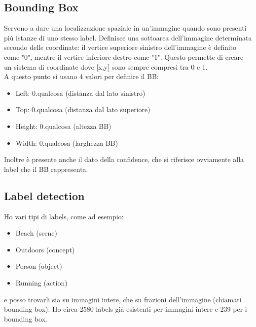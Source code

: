 \documentclass{classes/base}
\begin{document}
    \subsection*{Bounding Box}
    Servono a dare una localizzazione spaziale in un'immagine quando sono presenti più istanze di uno stesso label.
    Definisce una sottoarea dell'immagine determinata secondo delle coordinate: il vertice superiore sinistro dell'immagine è definito come "0", mentre il vertice inferiore destro come "1". 
    Questo permette di creare un sistema di coordinate dove [x,y] sono sempre compresi tra 0 e 1. \\
    A questo punto si usano 4 valori per definire il BB: 
    \begin{itemize}
        \item Left: 0.qualcosa (distanza dal lato sinistro)
        \item Top: 0.qualcosa (distanza dal lato superiore)  
        \item Height: 0.qualcosa (altezza BB)
        \item Width: 0.qualcosa (larghezza BB)
    \end{itemize}
    Inoltre è presente anche il dato della confidence, che si riferisce ovviamente alla label che il BB rappresenta.

    \subsection*{Label detection}
    Ho vari tipi di labels, come ad esempio: 
    \begin{itemize}
        \item Beach (scene)
        \item Outdoors (concept)
        \item Person (object)
        \item Running (action)
    \end{itemize}
    e posso trovarli sia su immagini intere, che su frazioni dell'immagine (chiamati bounding box). 
    Ho circa 2580 labels già esistenti per immagini intere e 239 per i bounding box.
\end{document}
